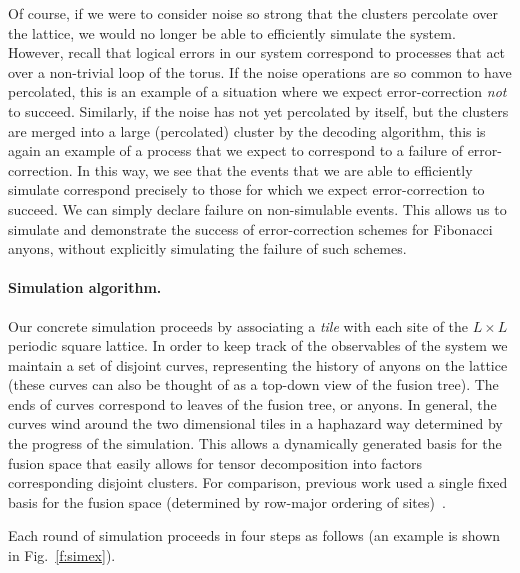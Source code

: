 \documentclass[aps, prl, letterpaper, twocolumn, superscriptaddress, notitlepage, 10pt]{revtex4-1}
\newcommand{\Fref}[1]{Fig.~\ref{#1}}
\begin{document}
Of course, if we were to consider noise so strong that the clusters percolate over the lattice, 
we would no longer be able to efficiently simulate the system. However, recall that logical 
errors in our system correspond to processes that act over a non-trivial loop of the torus. If 
the noise operations are so common to have percolated, this is an example of a situation 
where we expect error-correction \emph{not} to succeed. Similarly, if the noise has not yet 
percolated by itself, but the clusters are merged into a large (percolated) cluster by the 
decoding algorithm, this is again an example of a process that we expect to correspond to a 
failure of error-correction. In this way, we see that the events that we are able to efficiently 
simulate correspond precisely to those for which we expect error-correction to succeed. We 
can simply declare failure on non-simulable events. This allows us to simulate and 
demonstrate the success of error-correction schemes for Fibonacci anyons, without explicitly 
simulating the failure of such schemes.

\paragraph{Simulation algorithm.}

Our concrete simulation proceeds by associating a \emph{tile} with each site of the 
$L\times L$ periodic square lattice. In order to keep track of the observables of the system 
we maintain a set of disjoint curves, representing the history of anyons on the lattice (these 
curves can also be thought of as a top-down view of the fusion tree). The ends of curves 
correspond to leaves of the fusion tree, or anyons. In general, the curves wind around the two 
dimensional tiles in a haphazard way determined by the progress of the simulation. This 
allows a dynamically generated basis for the fusion space that easily allows for tensor 
decomposition into factors corresponding disjoint clusters. For comparison, previous work 
used a single fixed basis for the fusion space (determined by row-major ordering of 
sites)~\cite{Brell2013}.

Each round of simulation proceeds in four steps as follows (an example is shown 
in \Fref{f:simex}).
\end{document}
